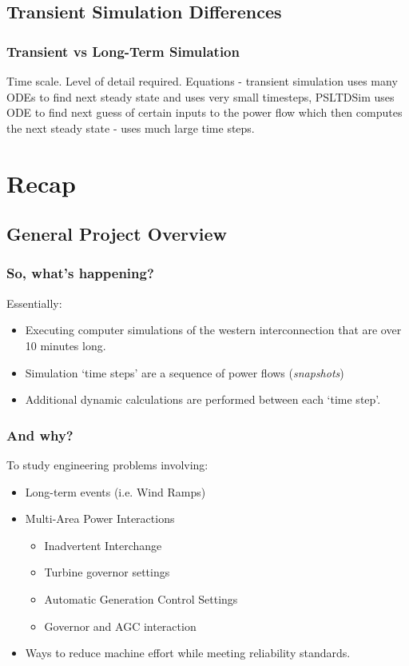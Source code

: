 \documentclass[14pt, unknownkeysallowed]{beamer}
\begin{document}
\subsection{Transient Simulation Differences}
\begin{frame}
\frametitle{Transient vs Long-Term Simulation}
Time scale.
Level of detail required.
Equations - transient simulation uses many ODEs to find next steady state and uses very small timesteps, 
PSLTDSim uses ODE to find next guess of certain inputs to the power flow which then computes the next steady state - uses much large time steps.
\end{frame}
\section{Recap}
\subsection{General Project Overview}
\begin{frame}
\frametitle{So, what's happening?}
Essentially:
\begin{itemize}
	\item Executing computer simulations of the western interconnection that are  over 10 minutes long.
	\item Simulation `time steps' are a sequence of power flows (\emph{snapshots})
	\item Additional dynamic calculations are performed between each `time step'.
\end{itemize}

\end{frame}
\begin{frame}
\frametitle{And why?}
To study engineering problems involving:
\begin{itemize}
	\item Long-term events (i.e. Wind Ramps)
	\item Multi-Area Power Interactions
	\begin{itemize}
		\item Inadvertent Interchange
		\item Turbine governor settings
		\item Automatic Generation Control Settings
		\item Governor and AGC interaction
	\end{itemize}
	\item Ways to reduce machine effort while meeting reliability standards.
\end{itemize}
\end{frame}
\end{document}
